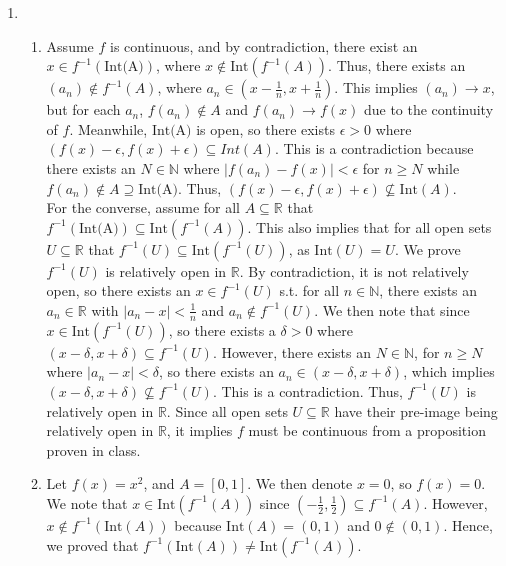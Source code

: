 \documentclass{article}
\begin{document}
\begin{enumerate}

\item
\begin{enumerate}
\item
Assume $f$ is continuous, and by contradiction, there exist an $x \in f^{-1}(\text{Int(A)})$, where $x \notin \text{Int}(f^{-1}(A))$. Thus, there exists an $(a_n) \notin f^{-1}(A)$, where $a_n \in (x - \frac{1}{n}, x + \frac{1}{n})$. This implies $(a_n) \rightarrow x$, but for each $a_n$, $f(a_n) \notin A$ and $f(a_n) \rightarrow f(x)$ due to the continuity of $f$. Meanwhile, $\text{Int(A)}$ is open, so there exists $\epsilon > 0$ where $(f(x) - \epsilon, f(x) + \epsilon) \subseteq Int(A)$. This is a contradiction because there exists an $N \in \mathbb{N}$ where $|f(a_n) - f(x)| < \epsilon$ for $n \geq N$ while $f(a_n) \notin A \supseteq \text{Int(A)}$. Thus, $(f(x) - \epsilon, f(x) + \epsilon) \not \subseteq \text{Int}(A)$. \\ 

For the converse, assume for all $A \subseteq \mathbb{R}$ that $f^{-1}(\text{Int(A)}) \subseteq \text{Int}(f^{-1}(A))$. This also implies that for all open sets $U \subseteq \mathbb{R}$ that $f^{-1}(U) \subseteq \text{Int}(f^{-1}(U))$, as $\text{Int}(U) = U$. We prove $f^{-1}(U)$ is relatively open in $\mathbb{R}$. By contradiction, it is not relatively open, so there exists an $x \in f^{-1}(U)$ s.t. for all $n \in \mathbb{N}$, there exists an $a_n \in \mathbb{R}$ with $|a_n - x| < \frac{1}{n}$ and $a_n \notin f^{-1}(U)$. We then note that since $x \in \text{Int}(f^{-1}(U))$, so there exists a $\delta > 0$ where $(x - \delta, x + \delta) \subseteq f^{-1}(U)$. However, there exists an $N \in \mathbb{N}$, for $n \geq N$ where $|a_n - x| < \delta$, so there exists an $a_n \in (x- \delta, x + \delta)$, which implies $(x - \delta, x + \delta) \not \subseteq f^{-1}(U)$. This is a contradiction. Thus, $f^{-1}(U)$ is relatively open in $\mathbb{R}$. Since all open sets $U \subseteq \mathbb{R}$ have their pre-image being relatively open in $\mathbb{R}$, it implies $f$ must be continuous from a proposition proven in class. \\

\item 
Let $f(x) = x^2$, and $A = [0, 1]$. We then denote $x = 0$, so $f(x) = 0$. We note that $x \in \text{Int}(f^{-1}(A))$ since $(-\frac{1}{2}, \frac{1}{2}) \subseteq f^{-1}(A)$. However, $x \notin f^{-1}(\text{Int}(A))$ because $\text{Int}(A) = (0, 1)$ and $0 \notin (0, 1)$. Hence, we proved that $f^{-1}(\text{Int}(A)) \not = \text{Int}(f^{-1}(A))$. 
\end{enumerate}


\end{enumerate}
\end{document}
